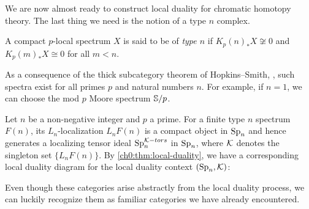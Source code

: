 We are now almost ready to construct local duality for chromatic homotopy theory. The last thing we need is the notion of a type $n$ complex. 

\begin{definition}
    \label{ch0:def:type-n-spectrum}
    A compact $p$-local spectrum $X$ is said to be of \emph{type $n$} if $K_p(n)_* X\not\cong 0$ and $K_p(m)_*X\cong 0$ for all $m<n$. 
\end{definition}

As a consequence of the thick subcategory theorem of Hopkins--Smith, \cite[Theorem 7]{hopkins-smith_1998}, such spectra exist for all primes $p$ and natural numbers $n$. For example, if $n=1$, we can choose the mod $p$ Moore spectrum $\S/p$.  

\begin{construction}
    \label{ch0:const:chromatic-duality}
    Let $n$ be a non-negative integer and $p$ a prime. For a finite type $n$ spectrum $F(n)$, its $L_n$-localization $L_nF(n)$ is a compact object in $\Sp\np$ and hence generates a localizing tensor ideal $\Sp\np^{\K-tors}$ in $\Sp\np$, where $\K$ denotes the singleton set $\{L_nF(n)\}$. By \cref{ch0:thm:local-duality}, we have a corresponding local duality diagram for the local duality context $(\Sp\np, \K)$:
    \begin{center}
    \end{center}
\end{construction}

Even though these categories arise abstractly from the local duality process, we can luckily recognize them as familiar categories we have already encountered.

